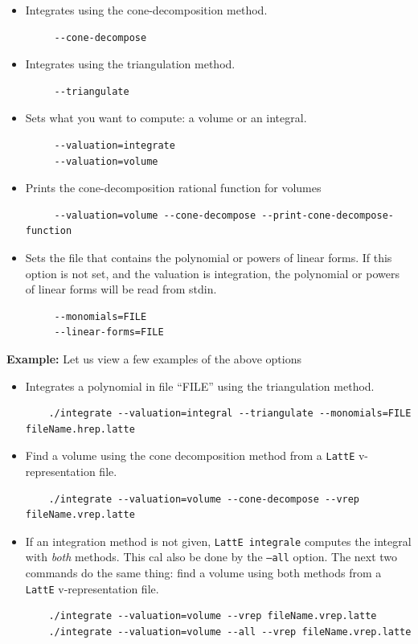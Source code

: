 \documentclass{article}
\newcommand{\latte}{{\tt LattE}\xspace}
\newcommand{\latteInt}{{\tt LattE integrale}\xspace}
\newcommand{\example}{{\bf Example:\space}}
\begin{document}
\begin{itemize}
\item Integrates using the cone-decomposition method.
	\begin{verbatim}
     --cone-decompose
	\end{verbatim} 	
\item Integrates using the triangulation method.
	\begin{verbatim}
     --triangulate
	\end{verbatim} 	
\item Sets what you want to compute: a volume or an integral.
	\begin{verbatim}
     --valuation=integrate
     --valuation=volume
	\end{verbatim} 	
\item Prints the cone-decomposition rational function for volumes
	\begin{verbatim}
     --valuation=volume --cone-decompose --print-cone-decompose-function
	\end{verbatim} 	
\item Sets the file that contains the polynomial or powers of linear forms. If this option is not set, and the valuation is integration, the polynomial or powers of linear forms will be read from stdin.
	\begin{verbatim}
     --monomials=FILE
     --linear-forms=FILE
	\end{verbatim} 	
\end{itemize}

\example
Let us view a few examples of the above options

\begin{itemize}
\item Integrates a polynomial in file ``FILE'' using the triangulation method. 
	\begin{verbatim}
	./integrate --valuation=integral --triangulate --monomials=FILE fileName.hrep.latte
	\end{verbatim} 	
\item Find a volume using the cone decomposition method from a \latte v-representation file.
	\begin{verbatim}
	./integrate --valuation=volume --cone-decompose --vrep fileName.vrep.latte
	\end{verbatim} 	
\item If an integration method is not given, \latteInt computes the integral with \emph{both} methods. This cal also be done by the {\tt --all} option. The next two commands do the same thing: find a volume using both methods from a \latte v-representation file.
	\begin{verbatim}
	./integrate --valuation=volume --vrep fileName.vrep.latte
	./integrate --valuation=volume --all --vrep fileName.vrep.latte	
	\end{verbatim} 	
\end{itemize}
           
\end{document}
